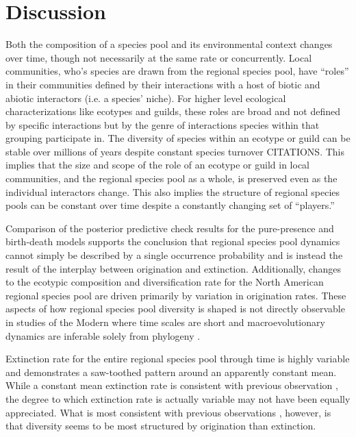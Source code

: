 \documentclass[12pt,letterpaper]{article}
\begin{document}
\section*{Discussion}

Both the composition of a species pool and its environmental context changes over time, though not necessarily at the same rate or concurrently. Local communities, who's species are drawn from the regional species pool, have ``roles'' in their communities defined by their interactions with a host of biotic and abiotic interactors (i.e. a species' niche). For higher level ecological characterizations like ecotypes and guilds, these roles are broad and not defined by specific interactions but by the genre of interactions species within that grouping participate in. The diversity of species within an ecotype or guild can be stable over millions of years despite constant species turnover \citep{Jernvall2004,Slater2015c} CITATIONS. This implies that the size and scope of the role of an ecotype or guild in local communities, and the regional species pool as a whole, is preserved even as the individual interactors change. This also implies the structure of regional species pools can be constant over time despite a constantly changing set of ``players.''

Comparison of the posterior predictive check results for the pure-presence and birth-death models supports the conclusion that regional species pool dynamics cannot simply be described by a single occurrence probability and is instead the result of the interplay between origination and extinction. Additionally, changes to the ecotypic composition and diversification rate for the North American regional species pool are driven primarily by variation in origination rates. These aspects of how regional species pool diversity is shaped is not directly observable in studies of the Modern where time scales are short and macroevolutionary dynamics are inferable solely from phylogeny \citep{Fritz2013a}.

Extinction rate for the entire regional species pool through time is highly variable and demonstrates a saw-toothed pattern around an apparently constant mean. While a constant mean extinction rate is consistent with previous observation \citep{Alroy1996a,Alroy2000g}, the degree to which extinction rate is actually variable may not have been equally appreciated. What is most consistent with previous observations \citep{Alroy1996a,Alroy2000g}, however, is that diversity seems to be most structured by origination than extinction.
\end{document}
